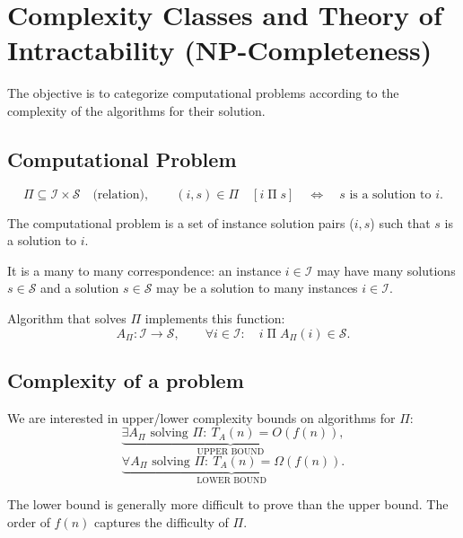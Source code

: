 \section{Complexity Classes and Theory of Intractability (NP-Completeness)}

The objective is to categorize computational problems according to the complexity of the algorithms for their solution.

\subsection{Computational Problem}
\begin{notesdefinition}
\[
\Pi\subseteq\mathcal I\times\mathcal S\quad\text{(relation)},\qquad
(i,s)\in\Pi\quad[i\mathrel\Pi s]\quad\Longleftrightarrow\quad s\text{ is a solution to }i.
\]

The computational problem is a set of instance solution pairs ($i,s$) such that $s$ is a solution to $i$.

It is a many to many correspondence: an instance $i\in\mathcal I$ may have many solutions $s\in\mathcal S$ and a solution $s\in\mathcal S$ may be a solution to many instances $i\in\mathcal I$.
\end{notesdefinition}

Algorithm that solves $\Pi$ implements this function:
\[
A_\Pi:\mathcal I\longrightarrow\mathcal S,\qquad
\forall i\in\mathcal I:\quad i\mathrel\Pi A_\Pi(i)\in\mathcal S.
\]

\subsection{Complexity of a problem}

We are interested in upper/lower complexity bounds on algorithms for $\Pi$:
\[
\underbrace{\exists A_\Pi\text{ solving }\Pi:\ T_A(n)=O(f(n))}_{\text{UPPER BOUND}},
\]
\[
\underbrace{\forall A_\Pi\text{ solving }\Pi:\ T_A(n)=\Omega(f(n))}_{\text{LOWER BOUND}}.
\]

The lower bound is generally more difficult to prove than the upper bound.
The order of $f(n)$ captures the difficulty of $\Pi$.
